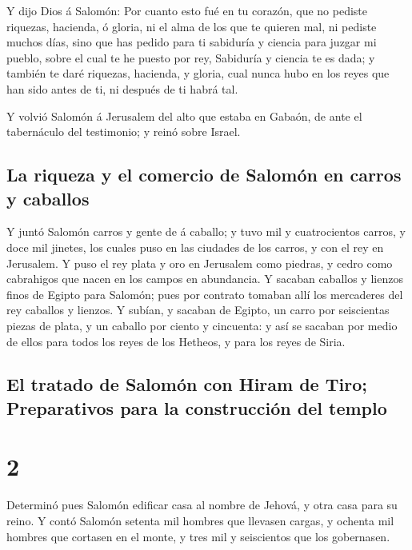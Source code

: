  Y dijo Dios á Salomón: Por cuanto esto fué en tu corazón,
que no pediste riquezas, hacienda, ó gloria, ni el alma de los que te
quieren mal, ni pediste muchos días, sino que has pedido para ti
sabiduría y ciencia para juzgar mi pueblo, sobre el cual te he puesto
por rey,  Sabiduría y ciencia te es dada; y también te daré
riquezas, hacienda, y gloria, cual nunca hubo en los reyes que han sido
antes de ti, ni después de ti habrá tal.

 Y volvió Salomón á Jerusalem del alto que estaba en
Gabaón, de ante el tabernáculo del testimonio; y reinó sobre Israel.

\hypertarget{la-riqueza-y-el-comercio-de-salomuxf3n-en-carros-y-caballos}{%
\subsection{La riqueza y el comercio de Salomón en carros y
caballos}\label{la-riqueza-y-el-comercio-de-salomuxf3n-en-carros-y-caballos}}

 Y juntó Salomón carros y gente de á caballo; y tuvo mil y
cuatrocientos carros, y doce mil jinetes, los cuales puso en las
ciudades de los carros, y con el rey en Jerusalem.  Y puso
el rey plata y oro en Jerusalem como piedras, y cedro como cabrahigos
que nacen en los campos en abundancia.  Y sacaban caballos
y lienzos finos de Egipto para Salomón; pues por contrato tomaban allí
los mercaderes del rey caballos y lienzos.  Y subían, y
sacaban de Egipto, un carro por seiscientas piezas de plata, y un
caballo por ciento y cincuenta: y así se sacaban por medio de ellos para
todos los reyes de los Hetheos, y para los reyes de Siria.

\hypertarget{el-tratado-de-salomuxf3n-con-hiram-de-tiro-preparativos-para-la-construcciuxf3n-del-templo}{%
\subsection{El tratado de Salomón con Hiram de Tiro; Preparativos para
la construcción del
templo}\label{el-tratado-de-salomuxf3n-con-hiram-de-tiro-preparativos-para-la-construcciuxf3n-del-templo}}

\hypertarget{section-1}{%
\section{2}\label{section-1}}

 Determinó pues Salomón edificar casa al nombre de Jehová, y
otra casa para su reino.  Y contó Salomón setenta mil
hombres que llevasen cargas, y ochenta mil hombres que cortasen en el
monte, y tres mil y seiscientos que los gobernasen.

